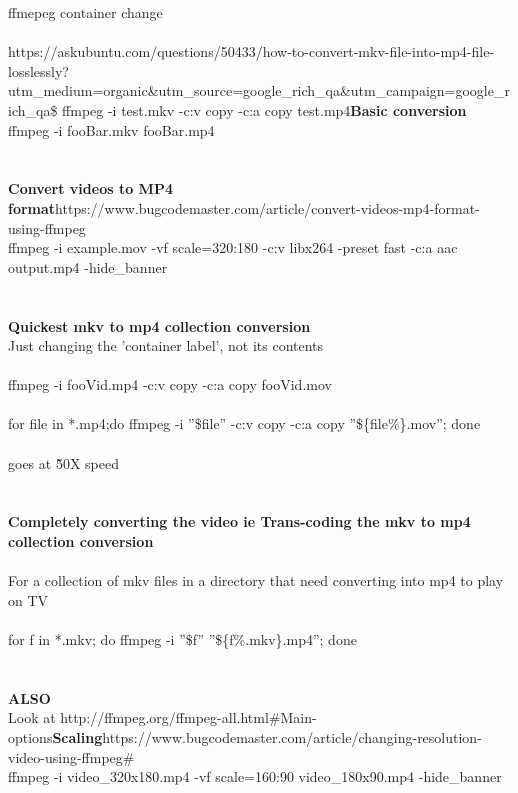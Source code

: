 \documentclass[10pt,a4paper]{article}
\begin{document}
{{{{{{{{{{{{{{ ffmepeg container change\\
\\
https://askubuntu.com/questions/50433/how-to-convert-mkv-file-into-mp4-file-losslessly?utm\_medium=organic\&utm\_source=google\_rich\_qa\&utm\_campaign=google\_rich\_qa}{\large }{\large \$ ffmpeg -i test.mkv -c:v copy -c:a copy test.mp4}{\large }\textbf{{\large Basic conversion}}{\large \\
ffmpeg -i fooBar.mkv fooBar.mp4\\
\\
\\
\textbf{Convert videos to MP4 format}}{\large }https://www.bugcodemaster.com/article/convert-videos-mp4-format-using-ffmpeg{\large \\
		ffmpeg -i example.mov -vf scale=320:180 -c:v libx264 -preset fast -c:a aac output.mp4 -hide\_banner\\
\\
\\
\textbf{Quickest mkv to mp4 collection conversion}}{\large \\
Just changing the 'container label', not its contents           \\
\\
          	ffmpeg -i fooVid.mp4 -c:v copy -c:a copy fooVid.mov\\
          \\
		for file in *.mp4;do ffmpeg -i ''\$file'' -c:v copy -c:a copy ''\$\{file\%\}.mov''; done\\
\\
	goes at \~50X speed\\
\\
\\
\textbf{Completely converting the video ie Trans-coding the mkv to mp4 collection conversion}}{\large \\
\\
For a collection of mkv files in a directory that need converting into mp4 to play on TV\\
\\
for f in *.mkv; do ffmpeg -i ''\$f'' ''\$\{f\%.mkv\}.mp4''; done\\
\\
\\
\textbf{ALSO}}{\large \\
Look at  http://ffmpeg.org/ffmpeg-all.html\#Main-options}{\large \textbf{Scaling}}{\large }https://www.bugcodemaster.com/article/changing-resolution-video-using-ffmpeg\#{\large \\
ffmpeg -i video\_320x180.mp4 -vf scale=160:90 video\_180x90.mp4 -hide\_banner\\
}}}}}}}}}}}}}}
\end{document}
